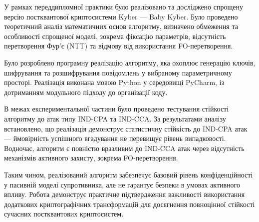 
У рамках переддипломної практики було реалізовано та досліджено спрощену версію постквантової криптосистеми Kyber — Baby Kyber. Було проведено теоретичний аналіз математичних основ алгоритму, визначено обмеження та особливості спрощеної моделі, зокрема фіксацію параметрів, відсутність перетворення Фур'є (NTT) та відмову від використання FO-перетворення.

Було розроблено програмну реалізацію алгоритму, яка охоплює генерацію ключів, шифрування та розшифрування повідомлень у вибраному параметричному просторі. Реалізація виконана мовою Python у середовищі PyCharm, із дотриманням модульного підходу до організації коду.

В межах експериментальної частини було проведено тестування стійкості алгоритму до атак типу IND-CPA та IND-CCA. За результатами аналізу встановлено, що реалізація демонструє статистичну стійкість до IND-CPA атак — ймовірність успішного вгадування не перевищує рівень випадковості. Водночас, алгоритм є повністю вразливим до IND-CCA атак через відсутність механізмів активного захисту, зокрема FO-перетворення.

Таким чином, реалізований алгоритм забезпечує базовий рівень конфіденційності у пасивній моделі супротивника, але не гарантує безпеки в умовах активного впливу. Робота демонструє практичне підтвердження важливості використання додаткових криптографічних трансформацій для досягнення повноцінної стійкості сучасних постквантових криптосистем.